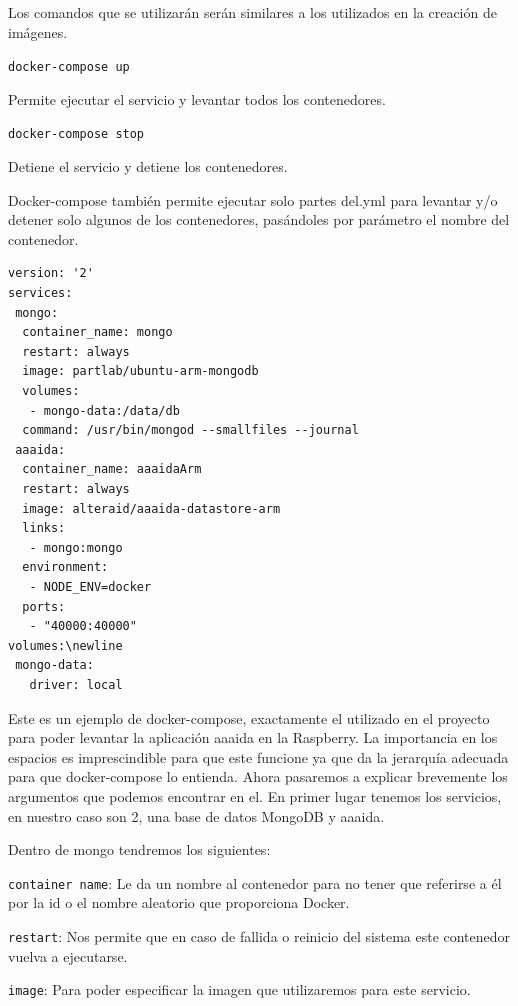 Los comandos que se utilizarán serán similares a los utilizados en la creación de imágenes.

\begin{center}
\texttt{docker-compose up}
\end{center} 

Permite ejecutar el servicio y levantar todos los contenedores.

\begin{center}
\texttt{docker-compose stop}
\end{center} 

Detiene el servicio y detiene los contenedores. 
\pagebreak 

Docker-compose también permite ejecutar solo partes del.yml para levantar y/o detener solo algunos de los contenedores, pasándoles por parámetro el nombre del contenedor.

\begin{center}
\begin{verbatim}
version: '2'
services:
 mongo:
  container_name: mongo
  restart: always
  image: partlab/ubuntu-arm-mongodb
  volumes:
   - mongo-data:/data/db
  command: /usr/bin/mongod --smallfiles --journal
 aaaida:
  container_name: aaaidaArm
  restart: always
  image: alteraid/aaaida-datastore-arm
  links:
   - mongo:mongo 
  environment:
   - NODE_ENV=docker
  ports:
   - "40000:40000"
volumes:\newline
 mongo-data:
   driver: local
\end{verbatim}
\end{center}

Este es un ejemplo de docker-compose, exactamente el utilizado en el proyecto para poder levantar la aplicación aaaida en la Raspberry. 
La importancia en los espacios es imprescindible para que este funcione ya que da la jerarquía adecuada para que docker-compose lo entienda.
Ahora pasaremos a explicar brevemente los argumentos que podemos encontrar en el. 
En primer lugar tenemos los servicios, en nuestro caso son 2, una base de datos MongoDB y aaaida.

Dentro de mongo tendremos los siguientes: 

\texttt{container name}: Le da un nombre al contenedor para no tener que referirse a él por la id o el nombre aleatorio que proporciona Docker.

\texttt{restart}: Nos permite que en caso de fallida o reinicio del sistema este contenedor vuelva a ejecutarse.

\texttt{image}: Para poder especificar la imagen que utilizaremos para este servicio.

